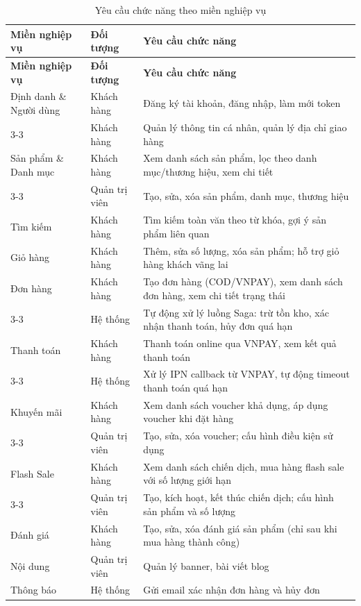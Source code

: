 \documentclass[../DoAn.tex]{subfiles}
\begin{document}
{%
\small\setlength{\tabcolsep}{3pt}\renewcommand{\arraystretch}{1.15}%
\begin{longtable}{|p{3.1cm}|p{2.4cm}|p{8.8cm}|}
\caption{Yêu cầu chức năng theo miền nghiệp vụ}
\label{table:functional-requirements} \\
\hline
\textbf{Miền nghiệp vụ} & \textbf{Đối tượng} & \textbf{Yêu cầu chức năng} \\ \hline
\endfirsthead
\hline
\textbf{Miền nghiệp vụ} & \textbf{Đối tượng} & \textbf{Yêu cầu chức năng} \\ \hline
\endhead
Định danh \& Người dùng & Khách hàng & Đăng ký tài khoản, đăng nhập, làm mới token \\ \cline{3-3}
                        & Khách hàng & Quản lý thông tin cá nhân, quản lý địa chỉ giao hàng \\ \hline
Sản phẩm \& Danh mục    & Khách hàng & Xem danh sách sản phẩm, lọc theo danh mục/thương hiệu, xem chi tiết \\ \cline{3-3}
                        & Quản trị viên & Tạo, sửa, xóa sản phẩm, danh mục, thương hiệu \\ \hline
Tìm kiếm                & Khách hàng & Tìm kiếm toàn văn theo từ khóa, gợi ý sản phẩm liên quan \\ \hline
Giỏ hàng                & Khách hàng & Thêm, sửa số lượng, xóa sản phẩm; hỗ trợ giỏ hàng khách vãng lai \\ \hline
Đơn hàng                & Khách hàng & Tạo đơn hàng (COD/VNPAY), xem danh sách đơn hàng, xem chi tiết trạng thái \\ \cline{3-3}
                        & Hệ thống   & Tự động xử lý luồng Saga: trừ tồn kho, xác nhận thanh toán, hủy đơn quá hạn \\ \hline
Thanh toán              & Khách hàng & Thanh toán online qua VNPAY, xem kết quả thanh toán \\ \cline{3-3}
                        & Hệ thống   & Xử lý IPN callback từ VNPAY, tự động timeout thanh toán quá hạn \\ \hline
Khuyến mãi              & Khách hàng & Xem danh sách voucher khả dụng, áp dụng voucher khi đặt hàng \\ \cline{3-3}
                        & Quản trị viên & Tạo, sửa, xóa voucher; cấu hình điều kiện sử dụng \\ \hline
Flash Sale              & Khách hàng & Xem danh sách chiến dịch, mua hàng flash sale với số lượng giới hạn \\ \cline{3-3}
                        & Quản trị viên & Tạo, kích hoạt, kết thúc chiến dịch; cấu hình sản phẩm và số lượng \\ \hline
Đánh giá                & Khách hàng & Tạo, sửa, xóa đánh giá sản phẩm (chỉ sau khi mua hàng thành công) \\ \hline
Nội dung                & Quản trị viên & Quản lý banner, bài viết blog \\ \hline
Thông báo               & Hệ thống   & Gửi email xác nhận đơn hàng và hủy đơn \\ \hline
\end{longtable}
}
\end{document}

